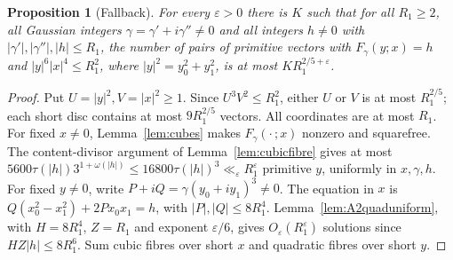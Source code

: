 \documentclass[11pt,reqno]{amsart}
\newtheorem{proposition}[theorem]{Proposition}
\theoremstyle{definition}
\theoremstyle{remark}
\numberwithin{equation}{section}
\newcommand{\eps}{\varepsilon}\newcommand{\card}{\#}
\begin{document}
\begin{proposition}[Fallback]\label{prop:A2fallback}
For every $\eps>0$ there is $K$ such that for all $R_1\ge2$,
all Gaussian integers $\gamma=\gamma'+i\gamma''\ne0$ and all integers
$h\ne0$ with $|\gamma'|,|\gamma''|,|h|\le R_1$, the number of pairs of
primitive vectors with $F_\gamma(y;x)=h$ and $|y|^6|x|^4\le R_1^2$, where
$|y|^2=y_0^2+y_1^2$, is at most $KR_1^{2/5+\eps}$.
\end{proposition}
\begin{proof}
Put $U=|y|^2,V=|x|^2\ge1$. Since $U^3V^2\le R_1^2$,
either $U$ or $V$ is at most $R_1^{2/5}$; each short disc contains
at most $9R_1^{2/5}$ vectors. All coordinates are at most $R_1$.
For fixed $x\ne0$, Lemma~\ref{lem:cubes} makes
$F_\gamma(\cdot\,;x)$ nonzero and squarefree. The content-divisor
argument of Lemma~\ref{lem:cubicfibre} gives at most
$5600\tau(|h|)3^{1+\omega(|h|)}\le16800\tau(|h|)^3
\ll_\eps R_1^\eps$ primitive $y$, uniformly in $x,\gamma,h$.
For fixed $y\ne0$, write $P+iQ=\gamma(y_0+iy_1)^3\ne0$.
The equation in $x$ is $Q(x_0^2-x_1^2)+2Px_0x_1=h$, with
$|P|,|Q|\le8R_1^4$. Lemma~\ref{lem:A2quaduniform}, with
$H=8R_1^4$, $Z=R_1$ and exponent $\eps/6$, gives
$O_\eps(R_1^\eps)$ solutions since $HZ|h|\le8R_1^6$.
Sum cubic fibres over short $x$ and quadratic fibres over short $y$.
\end{proof}
\end{document}
